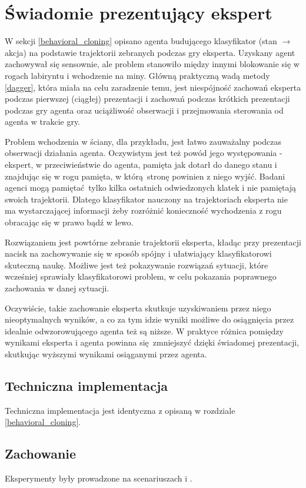 \section{Świadomie prezentujący ekspert}\label{presenting_expert}
W sekcji \ref{behavioral_cloning} opisano agenta budującego klasyfikator (stan $\to$ akcja) na podstawie trajektorii zebranych podczas gry eksperta. Uzyskany agent zachowywał się sensownie, ale problem stanowiło między innymi blokowanie się w rogach labiryntu i wchodzenie na miny. Główną praktyczną wadą metody \ref{dagger}, która miała na celu zaradzenie temu, jest niespójność zachowań eksperta podczas pierwszej (ciągłej) prezentacji i zachowań podczas krótkich prezentacji podczas gry agenta oraz uciążliwość obserwacji i przejmowania sterowania od agenta w trakcie gry.

Problem wchodzenia w ściany, dla przykładu, jest łatwo zauważalny podczas obserwacji działania agenta. Oczywistym jest też powód jego występowania - ekspert, w przeciwieństwie do agenta, pamięta jak dotarł do danego stanu i znajdując się w rogu pamięta, w którą stronę powinien z niego wyjść. Badani agenci mogą pamiętać tylko kilka ostatnich odwiedzonych klatek i nie pamiętają swoich trajektorii. Dlatego klasyfikator nauczony na trajektoriach eksperta nie ma wystarczającej informacji żeby rozróżnić konieczność wychodzenia z rogu obracając się w prawo bądź w lewo.

Rozwiązaniem jest powtórne zebranie trajektorii eksperta, kładąc przy prezentacji nacisk na zachowywanie się w sposób spójny i ułatwiający klasyfikatorowi skuteczną naukę. Możliwe jest też pokazywanie rozwiązań sytuacji, które wcześniej sprawiały klasyfikatorowi problem, w celu pokazania poprawnego zachowania w danej sytuacji.

Oczywiście, takie zachowanie eksperta skutkuje uzyskiwaniem przez niego nieoptymalnych wyników, a co za tym idzie wyniki możliwe do osiągnięcia przez idealnie odwzorowującego agenta też są niższe. W praktyce różnica pomiędzy wynikami eksperta i agenta powinna się zmniejszyć dzięki świadomej prezentacji, skutkując wyższymi wynikami osiąganymi przez agenta.

\subsection{Techniczna implementacja}

Techniczna implementacja jest identyczna z opisaną w rozdziale \ref{behavioral_cloning}.

\subsection{Zachowanie}
Eksperymenty były prowadzone na scenariuszach  i .

